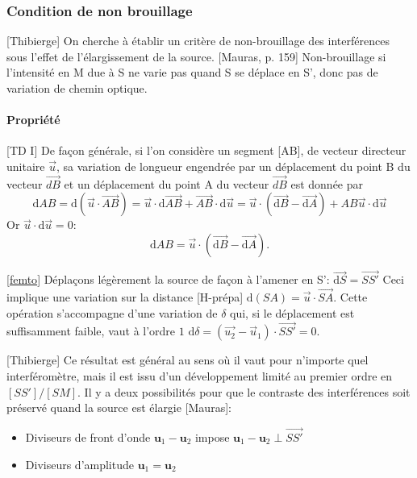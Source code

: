 \documentclass[11pt]{report}
\numberwithin{figure}{section}
\numberwithin{equation}{section}
\numberwithin{table}{section}
\newcommand{\ud}{\mathrm{d}}
\newcommand{\1}{\boldsymbol{1}}
\renewcommand{\u}{\boldsymbol{u}}
\begin{document}
\subsubsection{Condition de non brouillage}

[Thibierge] On cherche à établir un critère de non-brouillage des interférences sous l’effet de l’élargissement de la source. [Mauras, p. 159] Non-brouillage si l'intensité en M due à S ne varie pas quand S se déplace en S', donc pas de variation de chemin optique.

\paragraph{Propriété} [TD I] De façon générale, si l’on considère un segment [AB], de vecteur directeur unitaire $\vec{u}$, sa variation de longueur engendrée par un déplacement du point B du vecteur $\vec{dB}$ et un déplacement du point A du vecteur $\vec{dB}$ est donnée par
\begin{equation}
\ud AB = \ud(\vec{u} \cdot \vec{AB}) = \vec{u} \cdot \ud \vec{AB} + \vec{AB} \cdot \ud \vec{u} = \vec{u} \cdot (\vec{\ud B} - \vec{\ud A}) + AB \vec{u} \cdot \ud\vec{u}
\end{equation}
Or $\vec{u} \cdot \ud\vec{u} = 0$:
\begin{equation}
\ud AB = \vec{u} \cdot (\vec{\ud B} - \vec{\ud A}).
\end{equation}

[\href{https://femto-physique.fr/optique/coherence.php}{femto}] Déplaçons légèrement la source de façon à l'amener en S': $\vec{\ud S} = \vec{SS'}$ Ceci implique une variation sur la distance [H-prépa] $\ud(SA) = \vec{u} \cdot \vec{SA}$. Cette opération s'accompagne d'une variation de $\delta$ qui, si le déplacement est suffisamment faible, vaut à l'ordre $1$ $\ud \delta = (\vec{u_2} - \vec{u}_1) \cdot \vec{SS'} =0$.

[Thibierge] Ce résultat est général au sens où il vaut pour n’importe quel interféromètre, mais il est issu d’un développement limité au premier ordre en $[SS']/[SM]$. Il y a deux possibilités pour que le contraste des interférences soit préservé quand la source
est élargie [Mauras]:
\begin{itemize}
\item Diviseurs de front d'onde $\u_1 - \u_2$ impose $\u_1 - \u_2 \perp \vec{SS'}$
\item Diviseurs d'amplitude $\u_1 = \u_2$
\end{itemize}
\end{document}
